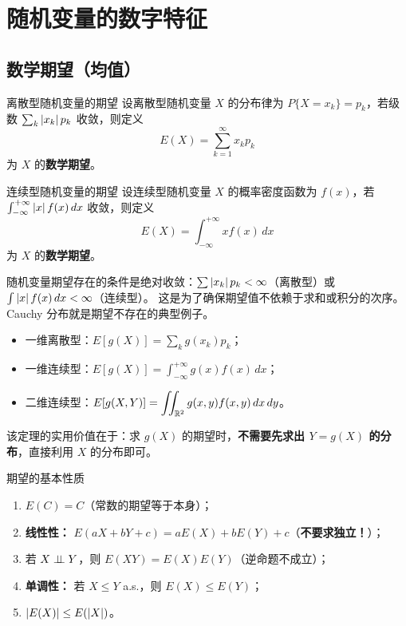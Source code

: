 \chapter{随机变量的数字特征}


\section{数学期望（均值）}

\begin{mydefinition}{离散型随机变量的期望}
	设离散型随机变量 $X$ 的分布律为 $P\{X = x_k\} = p_k$，若级数 $\sum_k \left|x_k\right| p_k$ 收敛，则定义
	\[E(X) = \sum_{k=1}^{\infty} x_k p_k\]
	为 $X$ 的\textbf{数学期望}。
\end{mydefinition}

\begin{mydefinition}{连续型随机变量的期望}
	设连续型随机变量 $X$ 的概率密度函数为 $f(x)$，若 $\int_{-\infty}^{+\infty} \left|x\right| f(x)\,dx$ 收敛，则定义
	\[E(X) = \int_{-\infty}^{+\infty} x f(x)\,dx\]
	为 $X$ 的\textbf{数学期望}。
\end{mydefinition}

\begin{remark}
随机变量期望存在的条件是绝对收敛：$\sum \left|x_k\right| p_k < \infty$（离散型）或 $\int \left|x\right| f(x)\,dx < \infty$（连续型）。
这是为了确保期望值不依赖于求和或积分的次序。Cauchy 分布就是期望不存在的典型例子。
\end{remark}

\begin{theorem}
\begin{itemize}
	\item 一维离散型：$\displaystyle E[g(X)] = \sum_{k} g(x_k) p_k$；
	\item 一维连续型：$\displaystyle E[g(X)] = \int_{-\infty}^{+\infty} g(x) f(x)\,dx$；
	\item 二维连续型：$\displaystyle E[g(X, Y)] = \iint_{\mathbb{R}^2} g(x, y) f(x, y)\,dx\,dy$。
\end{itemize}
该定理的实用价值在于：求 $g(X)$ 的期望时，\textbf{不需要先求出 $Y = g(X)$ 的分布}，直接利用 $X$ 的分布即可。
\end{theorem}

\begin{myproperty}{期望的基本性质}
\begin{enumerate}
	\item $E(C) = C$（常数的期望等于本身）；
	\item \textbf{线性性：} $E(aX + bY + c) = aE(X) + bE(Y) + c$（\textbf{不要求独立！}）；
	\item 若 $X \perp\!\!\!\perp Y$，则 $E(XY) = E(X) E(Y)$（逆命题不成立）；
	\item \textbf{单调性：} 若 $X \leq Y$ a.s.，则 $E(X) \leq E(Y)$；
	\item $\left|E(X)\right| \leq E(\left|X\right|)$。
\end{enumerate}
\end{myproperty}

